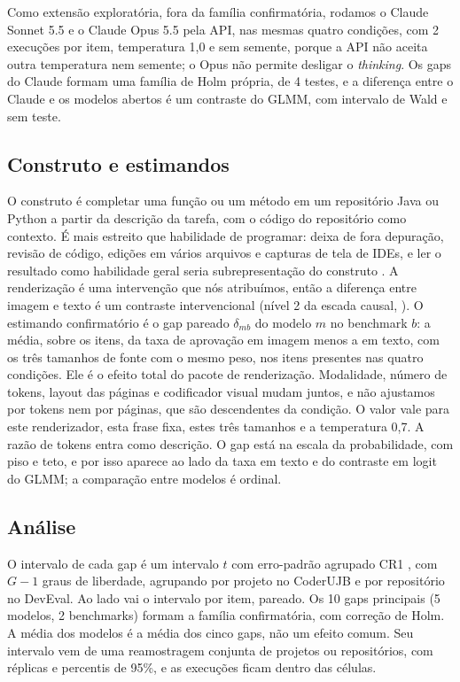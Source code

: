 Como extensão exploratória, fora da família confirmatória, rodamos o Claude Sonnet 5.5 e o Claude Opus 5.5 pela API, nas mesmas quatro condições, com 2 execuções por item, temperatura 1,0 e sem semente, porque a API não aceita outra temperatura nem semente; o Opus não permite desligar o \emph{thinking}. Os gaps do Claude formam uma família de Holm própria, de 4 testes, e a diferença entre o Claude e os modelos abertos é um contraste do GLMM, com intervalo de Wald e sem teste.

\subsection{Construto e estimandos}
O construto é completar uma função ou um método em um repositório Java ou Python a partir da descrição da tarefa, com o código do repositório como contexto. É mais estreito que habilidade de programar: deixa de fora depuração, revisão de código, edições em vários arquivos e capturas de tela de IDEs, e ler o resultado como habilidade geral seria subrepresentação do construto \citep{truong2026measurement}. A renderização é uma intervenção que nós atribuímos, então a diferença entre imagem e texto é um contraste intervencional (nível 2 da escada causal, \citealp[cap.~9]{truong2026measurement}). O estimando confirmatório é o gap pareado $\delta_{mb}$ do modelo $m$ no benchmark $b$: a média, sobre os itens, da taxa de aprovação em imagem menos a em texto, com os três tamanhos de fonte com o mesmo peso, nos itens presentes nas quatro condições. Ele é o efeito total do pacote de renderização. Modalidade, número de tokens, layout das páginas e codificador visual mudam juntos, e não ajustamos por tokens nem por páginas, que são descendentes da condição. O valor vale para este renderizador, esta frase fixa, estes três tamanhos e a temperatura 0,7. A razão de tokens entra como descrição. O gap está na escala da probabilidade, com piso e teto, e por isso aparece ao lado da taxa em texto e do contraste em logit do GLMM; a comparação entre modelos é ordinal.

\subsection{Análise}
O intervalo de cada gap é um intervalo $t$ com erro-padrão agrupado CR1 \citep{miller2024errorbars}, com $G-1$ graus de liberdade, agrupando por projeto no CoderUJB e por repositório no DevEval. Ao lado vai o intervalo por item, pareado. Os 10 gaps principais (5 modelos, 2 benchmarks) formam a família confirmatória, com correção de Holm. A média dos modelos é a média dos cinco gaps, não um efeito comum. Seu intervalo vem de uma reamostragem conjunta de projetos ou repositórios, com \bootReps{} réplicas e percentis de 95\%, e as execuções ficam dentro das células.

